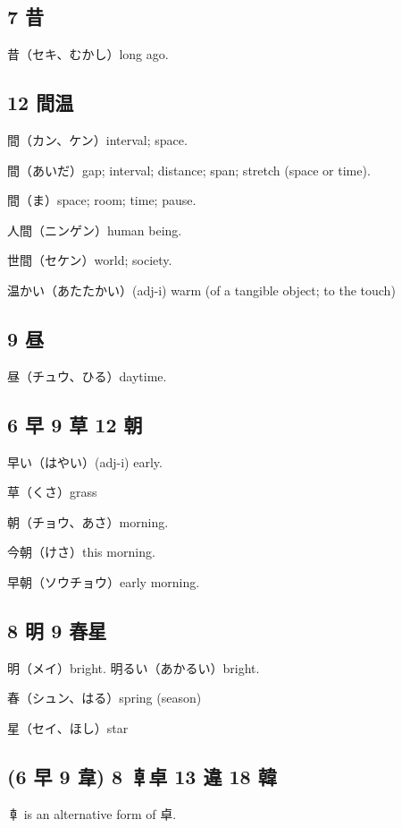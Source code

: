 \subsection{7 昔}

昔（セキ、むかし）long ago.

\subsection{12 間温}

間（カン、ケン）interval; space.

間（あいだ）gap; interval; distance; span; stretch (space or time).

間（ま）space; room; time; pause.

人間（ニンゲン）human being.

世間（セケン）world; society.

温かい（あたたかい）(adj-i) warm (of a tangible object; to the touch)

\subsection{9 昼}

昼（チュウ、ひる）daytime.

\subsection{6 早 9 草 12 朝}

早い（はやい）(adj-i) early.

草（くさ）grass

朝（チョウ、あさ）morning.

今朝（けさ）this morning.

早朝（ソウチョウ）early morning.

\subsection{8 明 9 春星}

明（メイ）bright.
明るい（あかるい）bright.

春（シュン、はる）spring (season)

星（セイ、ほし）star

\subsection{(6 早 9 韋) 8 𠦝卓 13 違 18 韓}

𠦝 is an alternative form of 卓.


